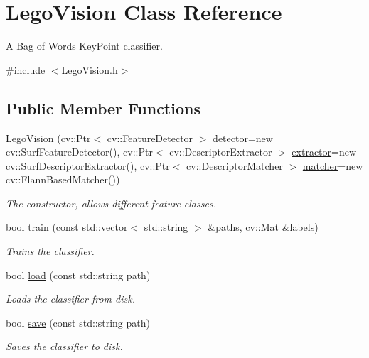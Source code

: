 \hypertarget{classLegoVision}{
\section{LegoVision Class Reference}
\label{classLegoVision}
}


A Bag of Words KeyPoint classifier.  




{\ttfamily \#include $<$LegoVision.h$>$}

\subsection*{Public Member Functions}
\begin{DoxyCompactItemize}
\item 
\hyperlink{classLegoVision_ae9612e1c30be7bc41ce92335b35eb729}{LegoVision} (cv::Ptr$<$ cv::FeatureDetector $>$ \hyperlink{classLegoVision_aac40598f5ee1c3d47b6b522434c7fc22}{detector}=new cv::SurfFeatureDetector(), cv::Ptr$<$ cv::DescriptorExtractor $>$ \hyperlink{classLegoVision_a4e2c9693477194621fa73f91e344543f}{extractor}=new cv::SurfDescriptorExtractor(), cv::Ptr$<$ cv::DescriptorMatcher $>$ \hyperlink{classLegoVision_a083739ef1478e1fa43e27572fcb5eab6}{matcher}=new cv::FlannBasedMatcher())
\begin{DoxyCompactList}\small\item\em The constructor, allows different feature classes. \item\end{DoxyCompactList}\item 
bool \hyperlink{classLegoVision_a8ada425fb6a2c65a4de8e81bb1fc4a72}{train} (const std::vector$<$ std::string $>$ \&paths, cv::Mat \&labels)
\begin{DoxyCompactList}\small\item\em Trains the classifier. \item\end{DoxyCompactList}\item 
bool \hyperlink{classLegoVision_a60b6fdf4ad64b87c5523a2e94a17e7fd}{load} (const std::string path)
\begin{DoxyCompactList}\small\item\em Loads the classifier from disk. \item\end{DoxyCompactList}\item 
bool \hyperlink{classLegoVision_ae1141c29fb3e96e834dddc7d36246110}{save} (const std::string path)
\begin{DoxyCompactList}\small\item\em Saves the classifier to disk. \item\end{DoxyCompactList}\item 

\end{DoxyCompactItemize}
